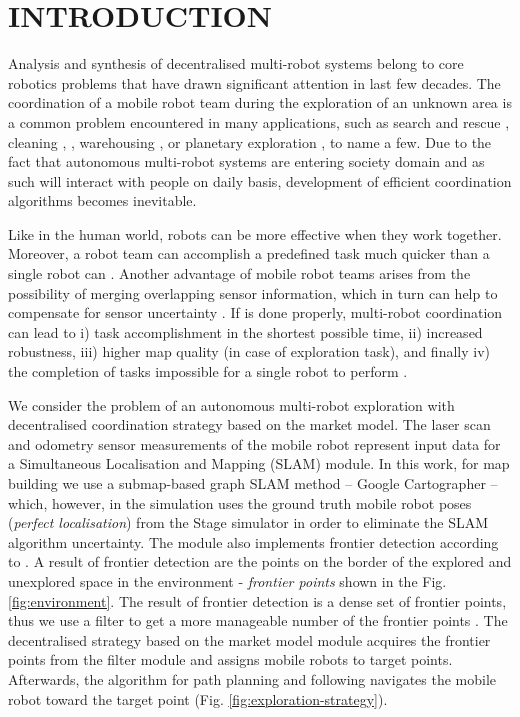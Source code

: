 \section{INTRODUCTION}
Analysis and synthesis of decentralised multi-robot systems belong to core robotics problems that have drawn significant attention in last few decades. The coordination of a mobile robot team during the exploration of an unknown area is a common problem encountered in many applications, such as search and rescue \cite{Murphy2004}, cleaning \cite{Endres}, \cite{Pinheiro2015}, warehousing \cite{Wurman2008}, or planetary exploration \cite{Mataric2001}, to name a few. Due to the fact that autonomous multi-robot systems are entering society domain and as such will interact with people on daily basis, development of efficient coordination algorithms becomes inevitable.

 Like in the human world, robots can be more effective when they work together. Moreover, a robot team can accomplish a predefined task much quicker than a single robot can \cite{Dias2000}. Another advantage of mobile robot teams arises from the possibility of merging overlapping sensor information, which in turn can help to compensate for sensor uncertainty \cite{Wurm2008}.
If is done properly, multi-robot coordination can lead to i) task accomplishment in the shortest possible time, ii) increased robustness, iii) higher map quality (in case of exploration task), and finally iv) the completion of tasks impossible for a single robot to perform \cite{Dias2006}.

We consider the problem of an autonomous multi-robot exploration with decentralised coordination strategy based on the market model. The laser scan and odometry sensor measurements of the mobile robot represent input data for a Simultaneous Localisation and Mapping (SLAM) module. In this work, for map building we use a submap-based graph SLAM method -- Google Cartographer \cite{Hess2016} -- which, however, in the simulation uses the ground truth mobile robot poses (\textit {perfect localisation}) from the Stage simulator \cite{stageweb} in order to eliminate the SLAM algorithm uncertainty. The module also implements frontier detection according to \cite{Orsulic2019}. A result of frontier detection are the points on the border of the explored and unexplored space in the environment - \textit{frontier points} shown in the Fig. \ref{fig:environment}. The result of frontier detection is a dense set of frontier points, thus we use a filter to get a more manageable number of the frontier points \cite{Umari2017}. The decentralised strategy based on the market model module acquires the frontier points from the filter module and assigns mobile robots to target points. Afterwards, the algorithm for path planning and following navigates the mobile robot toward the target point (Fig. \ref{fig:exploration-strategy}). 


